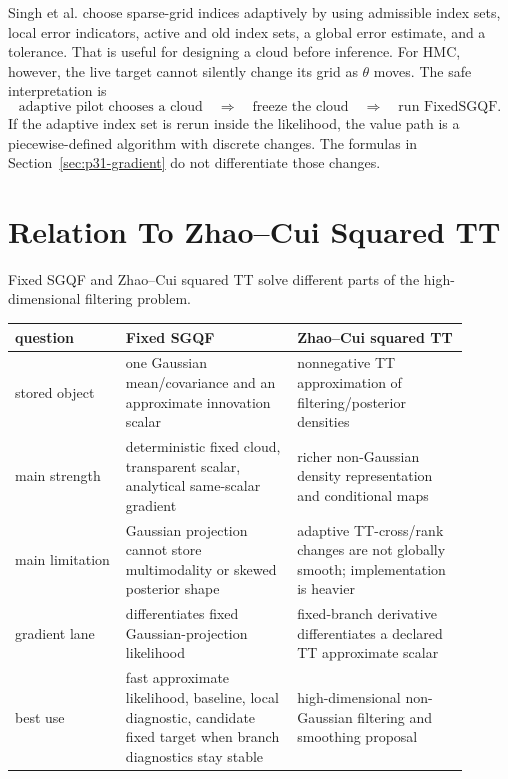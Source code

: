 \documentclass[11pt]{article}
\numberwithin{equation}{section}
\begin{document}
Singh et al. \cite{singh2018adaptive} choose sparse-grid indices adaptively by
using admissible index sets, local error indicators, active and old index
sets, a global error estimate, and a tolerance.  That is useful for designing a
cloud before inference.  For HMC, however, the live target cannot silently
change its grid as \(\theta\) moves.  The safe interpretation is
\begin{equation}
  \text{adaptive pilot chooses a cloud}
  \quad\Longrightarrow\quad
  \text{freeze the cloud}
  \quad\Longrightarrow\quad
  \text{run FixedSGQF}.
  \label{eq:p31-adaptive-to-fixed}
\end{equation}
If the adaptive index set is rerun inside the likelihood, the value path is a
piecewise-defined algorithm with discrete changes.  The formulas in
Section~\ref{sec:p31-gradient} do not differentiate those changes.

\section{Relation To Zhao--Cui Squared TT}
\label{sec:p31-comparison}

Fixed SGQF and Zhao--Cui squared TT solve different parts of the high-dimensional
filtering problem.

\begin{center}
\small
\begin{tabular}{p{0.22\linewidth}p{0.34\linewidth}p{0.34\linewidth}}
\toprule
question & Fixed SGQF & Zhao--Cui squared TT \\
\midrule
stored object & one Gaussian mean/covariance and an approximate innovation scalar & nonnegative TT approximation of filtering/posterior densities \\
main strength & deterministic fixed cloud, transparent scalar, analytical same-scalar gradient & richer non-Gaussian density representation and conditional maps \\
main limitation & Gaussian projection cannot store multimodality or skewed posterior shape & adaptive TT-cross/rank changes are not globally smooth; implementation is heavier \\
gradient lane & differentiates fixed Gaussian-projection likelihood & fixed-branch derivative differentiates a declared TT approximate scalar \\
best use & fast approximate likelihood, baseline, local diagnostic, candidate fixed target when branch diagnostics stay stable & high-dimensional non-Gaussian filtering and smoothing proposal \\
\bottomrule
\end{tabular}
\end{center}
\end{document}
